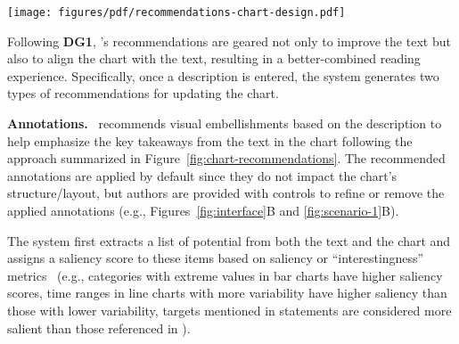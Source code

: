 {\begin{figure*}[t!]
    \centering
    \texttt{[image: figures/pdf/recommendations-chart-design.pdf]}
    \caption{Summary of \pluto's process for recommending chart design changes based on the authored text. Given a chart and accompanying text, the system extracts data references from both the chart and the text, and compares the references to suggest potential design changes to make the chart more structurally aligned to the text.}
    \label{fig:chart-recommendations}
\end{figure*}

\noindent{}Following \textbf{DG1}, \pluto's recommendations are geared not only to improve the text but also to align the chart with the text, resulting in a better-combined reading experience.
Specifically, once a description is entered, the system generates two types of recommendations for updating the chart.

\textbf{Annotations.}
\pluto~recommends visual embellishments based on the description to help emphasize the key takeaways from the text in the chart following the approach summarized in Figure~\ref{fig:chart-recommendations}.
The recommended annotations are applied by default since they do not impact the chart's structure/layout, but authors are provided with controls to refine or remove the applied annotations (e.g., Figures~\ref{fig:interface}B and \ref{fig:scenario-1}B).

The system first extracts a list of potential  from both the text and the chart and assigns a saliency score to these items based on saliency or ``interestingness'' metrics~\cite{demiralp2017foresight,wang2019datashot,srinivasan2018augmenting,lundgard2021accessible} (e.g., categories with extreme values in bar charts have higher saliency scores, time ranges in line charts with more variability have higher saliency than those with lower variability, targets mentioned in  statements are considered more salient than those referenced in ).

}
